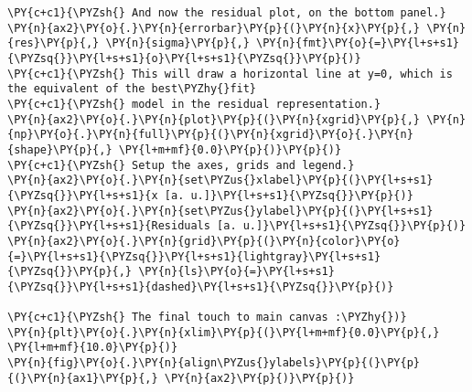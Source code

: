 \begin{Verbatim}[label=\makebox{\href{https://github.com/unipi-physics-labs/statnotes/tree/main/snippy/residual_plot.py}{https://github.com/.../residual\_plot.py}},commandchars=\\\{\}]
\PY{c+c1}{\PYZsh{} And now the residual plot, on the bottom panel.}
\PY{n}{ax2}\PY{o}{.}\PY{n}{errorbar}\PY{p}{(}\PY{n}{x}\PY{p}{,} \PY{n}{res}\PY{p}{,} \PY{n}{sigma}\PY{p}{,} \PY{n}{fmt}\PY{o}{=}\PY{l+s+s1}{\PYZsq{}}\PY{l+s+s1}{o}\PY{l+s+s1}{\PYZsq{}}\PY{p}{)}
\PY{c+c1}{\PYZsh{} This will draw a horizontal line at y=0, which is the equivalent of the best\PYZhy{}fit}
\PY{c+c1}{\PYZsh{} model in the residual representation.}
\PY{n}{ax2}\PY{o}{.}\PY{n}{plot}\PY{p}{(}\PY{n}{xgrid}\PY{p}{,} \PY{n}{np}\PY{o}{.}\PY{n}{full}\PY{p}{(}\PY{n}{xgrid}\PY{o}{.}\PY{n}{shape}\PY{p}{,} \PY{l+m+mf}{0.0}\PY{p}{)}\PY{p}{)}
\PY{c+c1}{\PYZsh{} Setup the axes, grids and legend.}
\PY{n}{ax2}\PY{o}{.}\PY{n}{set\PYZus{}xlabel}\PY{p}{(}\PY{l+s+s1}{\PYZsq{}}\PY{l+s+s1}{x [a. u.]}\PY{l+s+s1}{\PYZsq{}}\PY{p}{)}
\PY{n}{ax2}\PY{o}{.}\PY{n}{set\PYZus{}ylabel}\PY{p}{(}\PY{l+s+s1}{\PYZsq{}}\PY{l+s+s1}{Residuals [a. u.]}\PY{l+s+s1}{\PYZsq{}}\PY{p}{)}
\PY{n}{ax2}\PY{o}{.}\PY{n}{grid}\PY{p}{(}\PY{n}{color}\PY{o}{=}\PY{l+s+s1}{\PYZsq{}}\PY{l+s+s1}{lightgray}\PY{l+s+s1}{\PYZsq{}}\PY{p}{,} \PY{n}{ls}\PY{o}{=}\PY{l+s+s1}{\PYZsq{}}\PY{l+s+s1}{dashed}\PY{l+s+s1}{\PYZsq{}}\PY{p}{)}

\PY{c+c1}{\PYZsh{} The final touch to main canvas :\PYZhy{})}
\PY{n}{plt}\PY{o}{.}\PY{n}{xlim}\PY{p}{(}\PY{l+m+mf}{0.0}\PY{p}{,} \PY{l+m+mf}{10.0}\PY{p}{)}
\PY{n}{fig}\PY{o}{.}\PY{n}{align\PYZus{}ylabels}\PY{p}{(}\PY{p}{(}\PY{n}{ax1}\PY{p}{,} \PY{n}{ax2}\PY{p}{)}\PY{p}{)}
\end{Verbatim}
